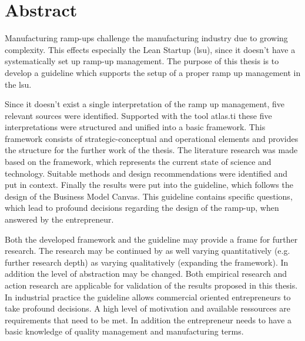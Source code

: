 \chapter*{Abstract}
Manufacturing ramp-ups challenge the manufacturing industry due to growing complexity. This effects especially the Lean Startup (\gls{lsu}), since it doesn't have a systematically set up ramp-up management. The purpose of this thesis is to develop a guideline which supports the setup of a proper ramp up management in the \gls{lsu}. 

Since it doesn't exist a single interpretation of the ramp up management, five relevant sources were identified. Supported with the tool atlas.ti these five interpretations were structured and unified into a basic framework. This framework consists of strategic-conceptual and operational elements and provides the structure for the further work of the thesis. The literature research was made based on the framework, which represents the current state of science and technology. Suitable methods and design recommendations were identified and put in context. Finally the results were put into the guideline, which follows the design of the Business Model Canvas. This guideline contains specific questions, which lead to profound decisions regarding the design of the ramp-up, when answered by the entrepreneur. 

Both the developed framework and the guideline may provide a frame for further research. %
The research may be continued by as well varying quantitatively (e.g. further research depth) as varying qualitatively (expanding the framework). In addition the level of abstraction may be changed. Both empirical research and action research are applicable for validation of the results proposed in this thesis. 
In industrial practice the guideline allows commercial oriented entrepreneurs to take profound decisions. A high level of motivation and available ressources are requirements that need to be met. In addition the entrepreneur needs to have a basic knowledge of quality management and manufacturing terms. 

